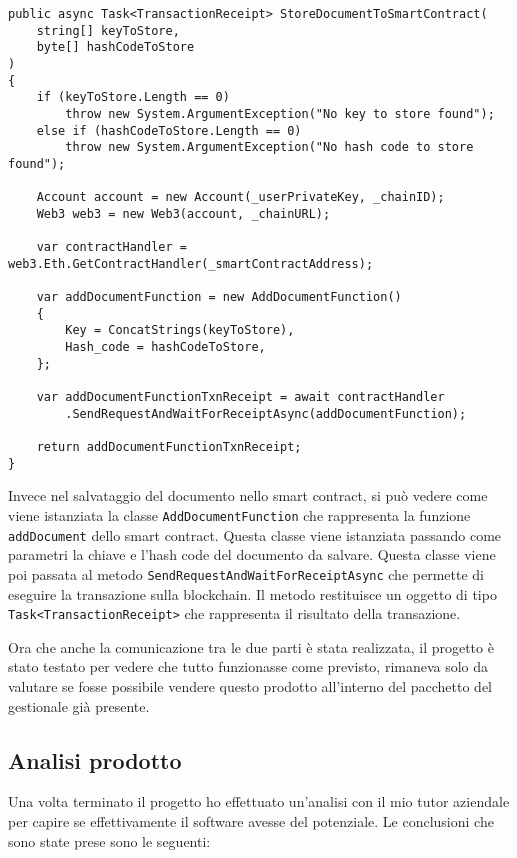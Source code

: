\begin{lstlisting}[language=CSharp]
public async Task<TransactionReceipt> StoreDocumentToSmartContract(
    string[] keyToStore,
    byte[] hashCodeToStore
)
{
    if (keyToStore.Length == 0)
        throw new System.ArgumentException("No key to store found");
    else if (hashCodeToStore.Length == 0) 
        throw new System.ArgumentException("No hash code to store found");

    Account account = new Account(_userPrivateKey, _chainID);
    Web3 web3 = new Web3(account, _chainURL);

    var contractHandler = web3.Eth.GetContractHandler(_smartContractAddress);

    var addDocumentFunction = new AddDocumentFunction()
    {
        Key = ConcatStrings(keyToStore),
        Hash_code = hashCodeToStore,
    };

    var addDocumentFunctionTxnReceipt = await contractHandler
        .SendRequestAndWaitForReceiptAsync(addDocumentFunction);

    return addDocumentFunctionTxnReceipt;
}\end{lstlisting}

Invece nel salvataggio del documento nello smart contract, si può vedere come
viene istanziata la classe \texttt{AddDocumentFunction} che rappresenta la
funzione \texttt{addDocument} dello smart contract. Questa classe viene
istanziata passando come parametri la chiave e l'hash code del documento da
salvare. Questa classe viene poi passata al metodo
\texttt{SendRequestAndWaitForReceiptAsync} che permette di eseguire la
transazione sulla blockchain. Il metodo restituisce un oggetto di tipo
\texttt{Task<TransactionReceipt>} che rappresenta il risultato della
transazione.

Ora che anche la comunicazione tra le due parti è stata realizzata,
il progetto è stato testato per vedere che tutto funzionasse come previsto, 
rimaneva solo da valutare se fosse possibile vendere questo prodotto 
all'interno del pacchetto del gestionale già presente.

\subsection{Analisi prodotto}
Una volta terminato il progetto ho effettuato un'analisi con il mio tutor 
aziendale per capire se effettivamente il software avesse del potenziale.
Le conclusioni che sono state prese sono le seguenti:

